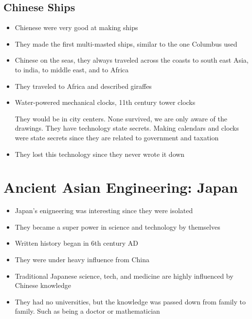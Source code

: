 \documentclass{article}
\begin{document}
\subsection{Chinese Ships}
\begin{itemize}
  \item Chienese were very good at making ships
  \item They made the first multi-masted ships, similar
    to the one Columbus used
  \item Chinese on the seas, they always traveled across the coasts to south east Asia,
    to india, to middle east, and to Africa
  \item They traveled to Africa and described giraffes
  \item Water-powered mechanical clocks, 11th century tower clocks

    They would be in city centers. None survived,
    we are only aware of the drawings.
    They have technology state secrets. Making calendars
    and clocks were state secrets since they are related
    to government and taxation
  \item They lost this technology since they never wrote it down
\end{itemize}

\section{Ancient Asian Engineering: Japan}
\begin{itemize}
  \item Japan's enigneering was interesting since
    they were isolated
  \item They became a super power in science and technology by themselves
  \item Written history began in 6th century AD
  \item They were under heavy influence from China
  \item Traditional Japanese science, tech, and medicine are highly influenced by
    Chinese knowledge
  \item They had no universities, but the knowledge was passed down
    from family to family. Such as being a doctor or mathematician
\end{itemize}
\end{document}

